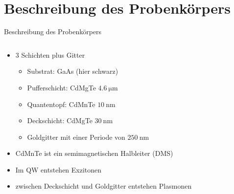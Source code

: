 \section{Beschreibung des Probenkörpers}
\begin{frame}{Beschreibung des Probenkörpers}
    \pause
    \begin{columns}
        \begin{column}{0.5\textwidth}
            \begin{itemize}
                \item <1-> 3 Schichten plus Gitter
                \begin{itemize}
                    \item <2-> Substrat: GaAs (hier schwarz)
                    \bigskip
                    \item <3-> Pufferschicht: CdMgTe $\SI{4,6}{\micro\meter}$
                    \item <3-> Quantentopf: CdMnTe $\SI{10}{\nano\meter}$
                    \item <3-> Deckschicht: CdMgTe $\SI{30}{\nano\meter}$ 
                    \bigskip
                    \item <4-> Goldgitter mit einer Periode von $\SI{250}{\nano\meter}$
                \end{itemize}
                \bigskip
                \item <5-> CdMnTe ist ein semimagnetischen Halbleiter (DMS)
                \item <6-> Im QW entstehen Exzitonen
                \item <7-> zwischen Deckschicht und Goldgitter entstehen Plasmonen
            \end{itemize}
        \end{column}
        \begin{column}{0.5\textwidth}
            \centering        
        \end{column}
    \end{columns}
\end{frame}
